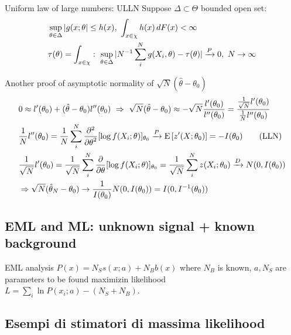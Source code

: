\documentclass[asd-beamer.tex]{subfiles}%
\begin{document}
\begin{frame}{Uniform law of large numbers: ULLN}
    Suppose $\Delta\subset\Theta$ bounded open set:
    \begin{align*}
        &\sup_{\theta\in\Delta}|g(x;\theta|\leq h(x),\ \int_{x\in\chi}h(x)\,dF(x)<\infty\\
            &\tau(\theta)=\int_{x\in\chi}:\ \sup_{\theta\in\Delta}|\invers{N}\sum_i^Ng(X_i,\theta)-\tau(\theta)|\toinp{0},\ N\to\infty
    \end{align*}
\end{frame}

\begin{frame}{Another proof of asymptotic normality of $\sqrt{N}(\hat{\theta}-\theta_0)$}
    \begin{align*}
        &0\approx l'(\theta_0)+(\hat{\theta}-\theta_0)l''(\theta_0)\ \Rightarrow\ \sqrt{N}(\hat{\theta}-\theta_0)\approx-\sqrt{N}\frac{l'(\theta_0)}{l''(\theta_0)}=\frac{\frac{1}{\sqrt{N}}l'(\theta_0)}{\frac{1}{N}l''(\theta_0)}\\
        &\frac{1}{N}l''(\theta_0)=\frac{1}{N}\sum_i^N\PtwoDof{\theta}[\log{f(X_i;\theta)}]_{\theta_0}\toinp{\E{[z'(X;\theta_0)]}}=-I(\theta_0)\tag{LLN}\\
        &\frac{1}{\sqrt{N}}l'(\theta_0)=\frac{1}{\sqrt{N}}\sum_i^N\PDof{\theta}[\log{f(X_i;\theta)}]_{\theta_0}=\frac{1}{\sqrt{N}}\sum_i^Nz(X_i;\theta_0)\toind{}N(0,I(\theta_0))\\
        &\Rightarrow \sqrt{N}(\hat{\theta}_N-\theta_0)\to\frac{1}{I(\theta_0)}N(0,I(\theta_0))=I(0,\invers{I}(\theta_0))
    \end{align*}
\end{frame}

\subsection{EML and ML: unknown signal + known background}

\begin{frame}{EML analysis}
    $P(x)=N_Ss(x;a)+N_Bb(x)$ where $N_B$ is known, $a, N_S$ are parameters to be found maximizin likelihood $L=\sum_i\ln{P(x_i;a)}-(N_S+N_B)$.
\end{frame}

\subsection{Esempi di stimatori di massima likelihood}
\end{document}
